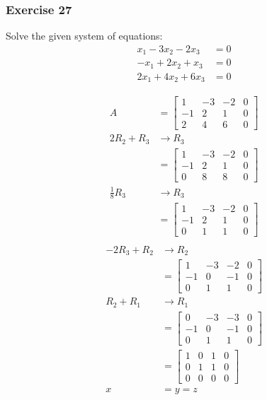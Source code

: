 \documentclass{math}
\begin{document}
\subsubsection*{Exercise 27}
Solve the given system of equations:
\begin{align*}
  x_1-3x_2-2x_3 &= 0 \\
  -x_1+2x_2+x_3 &= 0 \\
  2x_1+4x_2+6x_3 &= 0
\end{align*}
\begin{multicols}{2}
  \begin{align*}
    A &= \begin{bmatrix}
      1 & -3 & -2 & 0 \\
      -1 & 2 & 1 & 0 \\
      2 & 4 & 6 & 0
    \end{bmatrix} \\
    2R_2+R_3 &\to R_3 \\
    &= \begin{bmatrix}
      1 & -3 & -2 & 0 \\
      -1 & 2 & 1 & 0 \\
      0 & 8 & 8 & 0
    \end{bmatrix} \\
    \frac{1}{8}R_3 &\to R_3 \\
    &= \begin{bmatrix}
      1 & -3 & -2 & 0 \\
      -1 & 2 & 1 & 0 \\
      0 & 1 & 1 & 0
    \end{bmatrix} \\
  \end{align*}
  \begin{align*}
    -2R_3+R_2 &\to R_2 \\
    &= \begin{bmatrix}
      1 & -3 & -2 & 0 \\
      -1 & 0 & -1 & 0 \\
      0 & 1 & 1 & 0
    \end{bmatrix} \\
    R_2+R_1 &\to R_1 \\
    &= \begin{bmatrix}
      0 & -3 & -3 & 0 \\
      -1 & 0 & -1 & 0 \\
      0 & 1 & 1 & 0
    \end{bmatrix} \\
    &= \begin{bmatrix}
      1 & 0 & 1 & 0 \\
      0 & 1 & 1 & 0 \\
      0 & 0 & 0 & 0
    \end{bmatrix} \\
    x &= y = z
  \end{align*}
\end{multicols}
\end{document}
